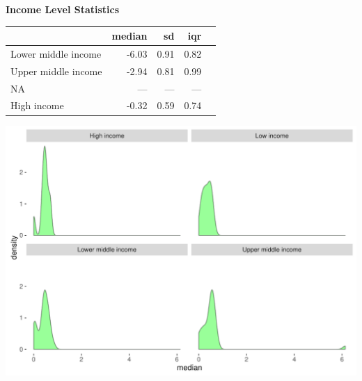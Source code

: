 \documentclass{article}\usepackage[]{graphicx}\usepackage[]{color}
\makeatletter
\def\maxwidth{ %
  \ifdim\Gin@nat@width>\linewidth
    \linewidth
  \else
    \Gin@nat@width
  \fi
}
\makeatother
\begin{document}
\newpage

  \raggedright{\color{white!30!black} \textbf{\Large Income Level Statistics}}
    \begin{minipage}[c]{0.99\textwidth}  
      \vspace*{0.4cm}
      
\begin{tabular}{lrrrl}
  & median & sd & iqr &  \\ 
  \hline
Lower middle income & -6.03 & 0.91 & 0.82 &  \\ 
  Upper middle income & -2.94 & 0.81 & 0.99 &  \\ 
  NA & --- & --- & --- &  \\ 
  High income & -0.32 & 0.59 & 0.74 &  \\ 
  \end{tabular}

      \vspace*{1cm}
    \end{minipage}
    
    \begin{minipage}[c]{0.99\textwidth}  
    


{\centering \includegraphics[width=\maxwidth]{figure/plot3-1} 

}



      \vspace*{0.5cm}
    \end{minipage}
\end{document}
